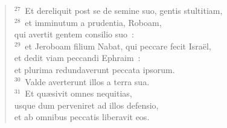 \begin{verse}${}^{27}$~Et dereliquit post se de semine suo, gentis stultitiam,\\
${}^{28}$~et imminutum a prudentia, Roboam,\\ qui avertit gentem consilio suo~:\\
${}^{29}$~et Jeroboam filium Nabat, qui peccare fecit Isra\"el,\\ et dedit viam peccandi Ephraim~:\\ et plurima redundaverunt peccata ipsorum.\\
${}^{30}$~Valde averterunt illos a terra sua.\\
${}^{31}$~Et qu\ae sivit omnes nequitias,\\ usque dum perveniret ad illos defensio,\\ et ab omnibus peccatis liberavit eos.\end{verse}


